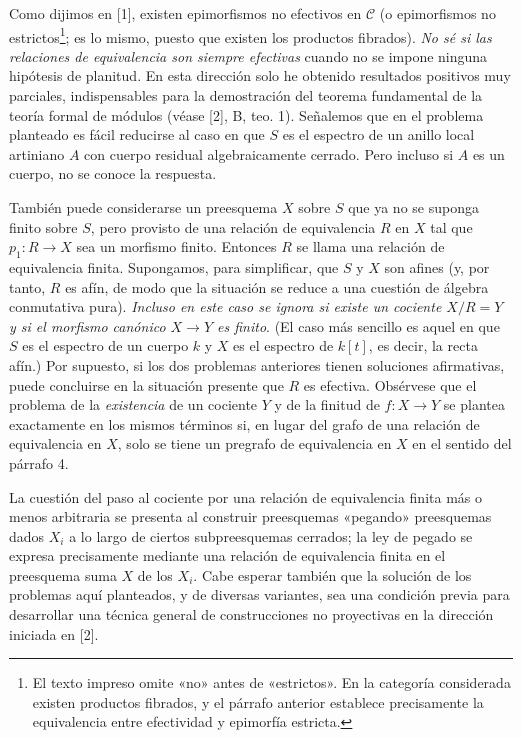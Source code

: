 \documentclass[11pt,twoside,openany]{book}
\numberwithin{equation}{section}
\newcommand{\src}[1]{%
  \phantomsection\hypertarget{src:#1}{}%
  \marginpar{\raggedleft\footnotesize\sffamily #1}%
}
\theoremstyle{plain}
\theoremstyle{definition}
\theoremstyle{remark}
\newcommand{\FgaUnitKey}{frontmatter}
\renewcommand{\src}[1]{%
  \phantomsection\hypertarget{src:\FgaUnitKey:#1}{}%
  \marginpar{\raggedleft\footnotesize\sffamily #1}%
}
\theoremstyle{plain}
\theoremstyle{definition}
\theoremstyle{remark}
\begin{document}
\src{103}
Como dijimos en [1], existen epimorfismos no efectivos en $\mathcal C$ (o
epimorfismos no estrictos\footnote{El texto impreso omite «no» antes de
«estrictos». En la categoría considerada existen productos fibrados, y el
párrafo anterior establece precisamente la equivalencia entre efectividad y
epimorfía estricta.}; es lo mismo, puesto que existen los productos fibrados).
\emph{No sé si las relaciones de equivalencia son siempre efectivas} cuando
no se impone ninguna hipótesis de planitud. En esta dirección solo he obtenido
resultados positivos muy parciales, indispensables para la demostración del
teorema fundamental de la teoría formal de módulos (véase [2], B, teo. 1).
Señalemos que en el problema planteado es fácil reducirse al caso en que $S$
es el espectro de un anillo local artiniano $A$ con cuerpo residual
algebraicamente cerrado. Pero incluso si $A$ es un cuerpo, no se conoce la
respuesta.

También puede considerarse un preesquema $X$ sobre $S$ que ya no se suponga
finito sobre $S$, pero provisto de una relación de equivalencia $R$ en $X$ tal
que $p_1:R\longrightarrow X$ sea un morfismo finito. Entonces $R$ se llama
una relación de equivalencia finita. Supongamos, para simplificar, que $S$ y
$X$ son afines (y, por tanto, $R$ es afín, de modo que la situación se reduce
a una cuestión de álgebra conmutativa pura). \emph{Incluso en este caso se
ignora si existe un cociente $X/R=Y$ y si el morfismo canónico
$X\longrightarrow Y$ es finito}. (El caso más sencillo es aquel en que $S$ es
el espectro de un cuerpo $k$ y $X$ es el espectro de $k[t]$, es decir, la
recta afín.) Por supuesto, si los dos problemas anteriores tienen soluciones
afirmativas, puede concluirse en la situación presente que $R$ es efectiva.
Obsérvese que el problema de la \emph{existencia} de un cociente $Y$ y de la
finitud de $f:X\longrightarrow Y$ se plantea exactamente en los mismos
términos si, en lugar del grafo de una relación de equivalencia en $X$, solo
se tiene un pregrafo de equivalencia en $X$ en el sentido del párrafo 4.

La cuestión del paso al cociente por una relación de equivalencia finita más
o menos arbitraria se presenta al construir preesquemas «pegando» preesquemas
dados $X_i$ a lo largo de ciertos subpreesquemas cerrados; la ley de pegado se
expresa precisamente mediante una relación de equivalencia finita en el
preesquema suma $X$ de los $X_i$. Cabe esperar también que la solución de los
problemas aquí planteados, y de diversas variantes, sea una condición previa
para desarrollar una técnica general de construcciones no proyectivas en la
dirección iniciada en [2].
\end{document}
